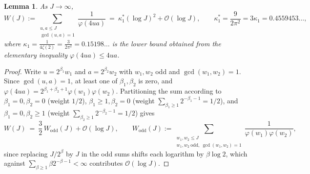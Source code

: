 \documentclass[11pt, a4paper]{article}
\theoremstyle{plain}
\newtheorem{lemma}[theorem]{Lemma}
\theoremstyle{definition}
\begin{document}
\begin{lemma}\label{lem:kappa1}
As $J\to\infty$,
$$W(J):=\sum_{\substack{u,a\le J\\ \gcd(u,a)=1}}\frac{1}{\varphi(4ua)}\ =\ \kappa_1^{\ast}(\log J)^{2}+\mathcal{O}(\log J),\qquad \kappa_1^{\ast}=\frac{9}{2\pi^{2}}=3\kappa_1=0.4559453\ldots,$$
where $\kappa_1=\frac{1}{4\zeta(2)}=\frac{3}{2\pi^{2}}=0.15198\ldots$ is the lower bound obtained from the elementary inequality $\varphi(4ua)\le 4ua$.
\end{lemma}
\begin{proof}
Write $u=2^{\beta_1}w_1$ and $a=2^{\beta_2}w_2$ with $w_1,w_2$ odd and $\gcd(w_1,w_2)=1$. Since $\gcd(u,a)=1$, at least one of $\beta_1,\beta_2$ is zero, and $\varphi(4ua)=2^{\beta_1+\beta_2+1}\varphi(w_1)\varphi(w_2)$. Partitioning the sum according to $\beta_1=0,\beta_2=0$ (weight $1/2$), $\beta_1\ge1,\beta_2=0$ (weight $\sum_{\beta_1\ge1}2^{-\beta_1-1}=1/2$), and $\beta_1=0,\beta_2\ge1$ (weight $\sum_{\beta_2\ge1}2^{-\beta_2-1}=1/2$) gives
$$W(J)\ =\ \frac32\,W_{\mathrm{odd}}(J)+\mathcal{O}(\log J),\qquad W_{\mathrm{odd}}(J):=\sum_{\substack{w_1,w_2\le J\\ w_1,w_2\ \mathrm{odd},\ \gcd(w_1,w_2)=1}}\frac{1}{\varphi(w_1)\varphi(w_2)},$$
since replacing $J/2^{\beta}$ by $J$ in the odd sums shifts each logarithm by $\beta\log 2$, which against $\sum_{\beta\ge1}\beta 2^{-\beta-1}<\infty$ contributes $\mathcal{O}(\log J)$.


\end{proof}
\end{document}
